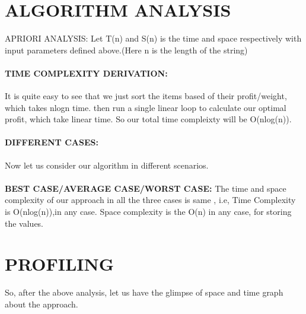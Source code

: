 \documentclass[10pt]{article}
\begin{document}
\begin{multicols*}{2}
\begin{lstlisting}
\end{lstlisting}
    

	
\section*{ALGORITHM ANALYSIS} 
	
APRIORI ANALYSIS: Let T(n) and S(n) is the time and space respectively with input parameters defined above.(Here n is the length of the string)

\paragraph{TIME COMPLEXITY DERIVATION:} It is quite easy to see that we just sort the items based of their profit/weight, which takes nlogn time. then run a single linear loop to calculate our optimal profit, which take linear time. So our total time compleixty will be O(nlog(n)).
\paragraph{DIFFERENT CASES:} Now let us consider our algorithm in different 
scenarios.\\\\\textbf{BEST CASE/AVERAGE CASE/WORST CASE:} The time and space complexity of our approach in all the three cases is same , i.e, Time Complexity is  O(nlog(n)),in any case. Space complexity is the O(n) in any case, for storing the values.

\section*{PROFILING}

So, after the above analysis, let us have the glimpse of space and time graph about the approach.


\end{multicols*}
\end{document}
